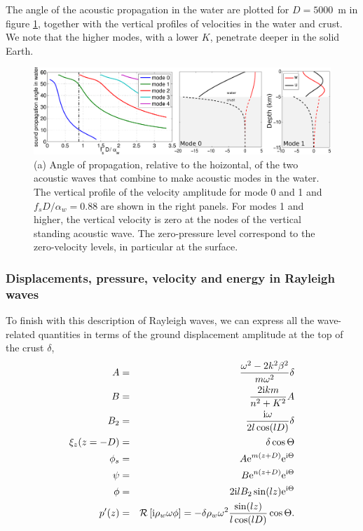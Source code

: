 The angle of the acoustic propagation in the water are plotted for $D=5000$~m 
in  figure \ref{fig:Rayleigh_angle}, together with the vertical profiles of velocities in the water and crust. 
We note that the higher modes, with a lower $K$, penetrate deeper in the solid Earth. 
\begin{figure}[htb]
\centerline{\includegraphics[width=\textwidth]{FIGS_CH_SISMO/Rayleigh_angle.pdf}}
  \caption{(a) Angle of propagation, relative to the hoizontal, of the two acoustic 
  waves that combine to make acoustic modes in the water. The vertical profile of the velocity amplitude for mode 0 and 1 and 
  $f_s D/\alpha_w=0.88$ are shown in the right panels. For modes 1 and higher, the vertical velocity is zero 
  at the nodes of the vertical standing acoustic wave. The zero-pressure level correspond to the zero-velocity levels,  
  in particular at the surface.}
\label{fig:Rayleigh_angle}
\end{figure}

\subsubsection{Displacements, pressure, velocity and energy in Rayleigh waves}
To finish with this description of Rayleigh waves, we can express 
all the wave-related quantities in terms of the ground displacement amplitude at the top of the crust  $\delta$,
\begin{eqnarray}
A &=& \frac{\omega^2-2k^2 \beta^2}{m \omega^2} \delta \\
 B&=& \frac{2 \mathrm{i} k m}{n^2+K^2} A \\
B_2 &=& \frac{\mathrm{i} \omega}{2 l \cos(lD)} \delta \\
\xi_z (z=-D) &=& \delta \cos \Theta \\
  \phi_s &=&  A \mathrm{e}^{m(z+D)}\mathrm{e}^{\mathrm{i} \Theta} \\
  \psi   &=& B  \mathrm{e}^{n(z+D)}\mathrm{e}^{\mathrm{i} \Theta} \\ 
\phi &=&  2 \mathrm{i} l B_2 \sin(lz) \mathrm{e}^{\mathrm{i} \Theta}  \\
p'(z)&=&  {\cal R}\left[\mathrm{i} \rho_w \omega \phi\right] =  - \delta \rho_w  \omega^2 \frac{\sin(lz)}{l\cos(lD)}  \cos \Theta.
\end{eqnarray}

